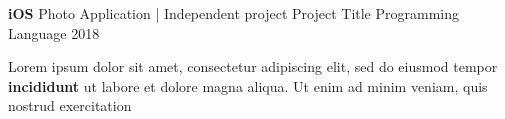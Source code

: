 \begin{cventries}
  \cventry
    {\textbf{iOS }Photo Application    |   Independent project} %
    {Project Title} %
    {Programming Language} %
    {2018} %
    {
      \begin{cvitems} %
        \item {Lorem ipsum dolor sit amet, consectetur adipiscing elit, sed do eiusmod tempor \textbf{incididunt} ut labore et dolore magna aliqua. Ut enim ad minim veniam, quis nostrud exercitation}
      \end{cvitems}
    }

\end{cventries}
